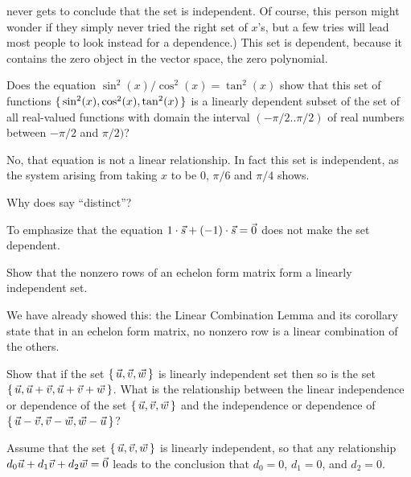 \begin{exercises}
\begin{answer}
\begin{exparts}
          never gets to conclude that the set is independent.
          Of course, this person might wonder if they simply never tried the
          right set of $x$'s, but a few tries will lead most people to 
          look instead for a dependence.)
        \partsitem This set is dependent, because it contains the 
          zero object in the vector space, the zero polynomial.
      \end{exparts}  
     \end{answer}
  \item 
    Does the equation \( \sin^2(x)/\cos^2(x)=\tan^2(x) \) show that
    this set of functions
    \( \mbox{$\{\,\sin^2(x),\cos^2(x),\tan^2(x)\,\}$} \) is a linearly dependent
    subset of the set of all real-valued functions with domain
    the interval \( (-\pi/2..\pi/2) \) of real numbers between 
    \( -\pi/2 \) and \( \pi/2) \)?
    \begin{answer}
      No, that equation is not a linear relationship.
      In fact this set is independent, as the system arising from taking
      \( x \) to be \( 0 \), \( \pi/6 \) and \( \pi/4 \) shows.  
    \end{answer}
  \item  
    Why does  say ``distinct''?
    \begin{answer}
      To emphasize that the equation 
      \( 1\cdot\vec{s}+(-1)\cdot\vec{s}=\vec{0} \)
      does not make the set dependent.
    \end{answer}
  \recommended \item
    Show that the nonzero rows of an echelon form matrix form a linearly
    independent set.
    \begin{answer}
      We have already showed this: the Linear Combination
      Lemma and its corollary state that in an echelon form matrix, 
      no nonzero row is a linear combination of the others.  
    \end{answer}
  \recommended \item
     \begin{exparts}
       \partsitem Show that if the set \( \mbox{$\{\,\vec{u},\vec{v},\vec{w}\,\}$} \)
          is linearly independent set then so is the set
          \( \mbox{$\{\,\vec{u},\vec{u}+\vec{v},\vec{u}+\vec{v}+\vec{w}\,\}$} \).
       \partsitem  What is the relationship between the linear independence
         or dependence of the set \( \mbox{$\{\,\vec{u},\vec{v},\vec{w}\,\}$} \) and the
         independence or dependence of
         \( \mbox{$\{\,\vec{u}-\vec{v},\vec{v}-\vec{w},\vec{w}-\vec{u}\,\}$} \)?
     \end{exparts}
     \begin{answer}
       \begin{exparts}
         \partsitem Assume that the set 
           \( \mbox{$\{\,\vec{u},\vec{v},\vec{w}\,\}$} \) is linearly 
           independent, so that any relationship
           $d_0\vec{u}+d_1\vec{v}+d_2\vec{w}=\vec{0}$ leads to the conclusion 
           that $d_0=0$, $d_1=0$, and $d_2=0$.


\end{exparts}
\end{answer}
\end{exercises}

